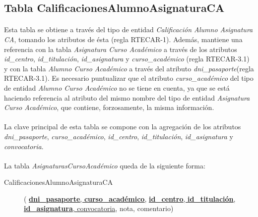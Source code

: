    \subsection{Tabla CalificacionesAlumnoAsignaturaCA}

      \paragraph{}Esta tabla se obtiene a través del tipo de entidad
      \textit{Calificación Alumno Asignatura CA}, tomando los atributos de ésta
      (regla RTECAR-1). Además, mantiene una referencia con la tabla
      \textit{Asignatura Curso Académico} a través de los atributos
      \textit{id\_centro}, \textit{id\_titulación}, \textit{id\_asignatura} y
      \textit{curso\_académico} (regla RTECAR-3.1) y con la tabla
      \textit{Alumno Curso Académico} a través del atributo
      \textit{dni\_pasaporte}(regla RTECAR-3.1). Es necesario puntualizar que el
      atributo \textit{curso\_académico} del tipo de entidad \textit{Alumno Curso
      Académico} no se tiene en cuenta, ya que se está haciendo referencia al
      atributo del mismo nombre del tipo de entidad \textit{Asignatura Curso
      Académico}, que contiene, forzosamente, la misma información.

      \paragraph{}La clave principal de esta tabla se compone con la agregación
      de los atributos \textit{dni\_pasaporte}, \textit{curso\_académico},
      \textit{id\_centro}, \textit{id\_titulación}, \textit{id\_asignatura} y
      \textit{convocatoria}.

      \paragraph{}La tabla \textit{AsignaturasCursoAcadémico} queda de la
      siguiente forma:

      \begin{description}
         \item[CalificacionesAlumnoAsignaturaCA] \begin{flushleft}(
         \underline{\textbf{dni\_pasaporte}, \textbf{curso\_académico},}
         \underline{\textbf{id\_centro}, \textbf{id\_titulación},
         \textbf{id\_asignatura}, convocatoria}, nota, comentario)
         \end{flushleft}
      \end{description}
